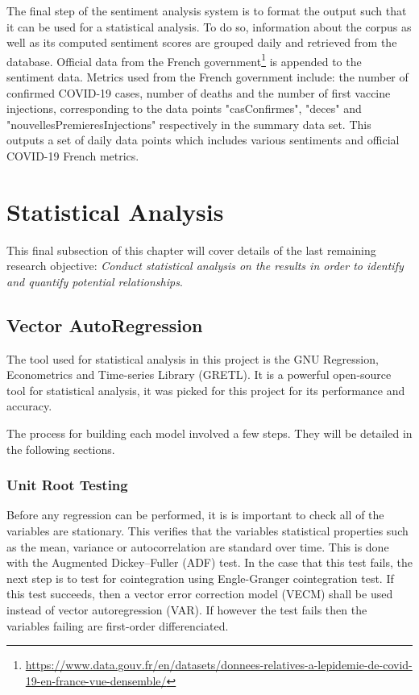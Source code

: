 The final step of the sentiment analysis system is to format the output such that it can be used for a statistical analysis. To do so, information about the corpus as well as its computed sentiment scores are grouped daily and retrieved from the database. Official data from the French government\footnote{\url{https://www.data.gouv.fr/en/datasets/donnees-relatives-a-lepidemie-de-covid-19-en-france-vue-densemble/}} is appended to the sentiment data. Metrics used from the French government include: the number of confirmed COVID-19 cases, number of deaths and the number of first vaccine injections, corresponding to the data points "casConfirmes", "deces" and "nouvellesPremieresInjections" respectively in the summary data set. This outputs a set of daily data points which includes various sentiments and official COVID-19 French metrics.

\section{Statistical Analysis}\label{chap: stat analysis}

This final subsection of this chapter will cover details of the last remaining research objective: \emph{Conduct statistical analysis on the results in order to identify and quantify potential relationships}.

\subsection{Vector AutoRegression}

The tool used for statistical analysis in this project is the GNU Regression, Econometrics and Time-series Library (GRETL). It is a powerful open-source tool for statistical analysis, it was picked for this project for its performance and accuracy.

The process for building each model involved a few steps. They will be detailed in the following sections.

\subsubsection{Unit Root Testing}

Before any regression can be performed, it is is important to check all of the variables are stationary. This verifies that the variables statistical properties such as the mean, variance or autocorrelation are standard over time. This is done with the Augmented Dickey–Fuller (ADF) test. In the case that this test fails, the next step is to test for cointegration using Engle-Granger cointegration test. If this test succeeds, then a vector error correction model (VECM) shall be used instead of vector autoregression (VAR). If however the test fails then the variables failing are first-order differenciated.

